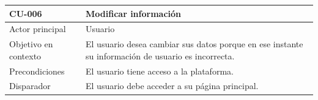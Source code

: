 
\begin{table}[htpb]
\centering
\begin{tabularx}{\textwidth}{|X|X|}
\hline
CU-006                            & Modificar información                                                                                                                                                                                                                                                                                                                                                                                                                                                                                \\ \hline
Actor principal                   & Usuario                                                                                                                                                                                                                                                                                                                                                                                                                                                                                              \\ \hline
Objetivo en contexto              & El usuario desea cambiar sus datos porque en ese instante su información de usuario es incorrecta.                                                                                                                                                                                                                                                                                                                                                                                                   \\ \hline
Precondiciones                    & El usuario tiene acceso a la plataforma.                                                                                                                                                                                                                                                                                                                                                                                                                                                             \\ \hline
Disparador                        & El usuario debe acceder a su página principal.                                                                                                                                                                                                                                                                                                                                                                                                                                                       \\ \hline

\end{tabularx}
\end{table}
